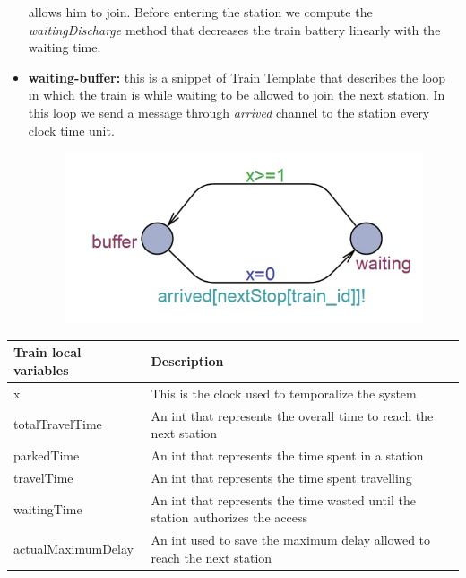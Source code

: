 \begin{itemize}
            allows him to join. Before entering the station we compute the \textit{waitingDischarge} method that decreases
            the train battery linearly with the waiting time.
    \item \textbf{waiting-buffer: }this is a snippet of Train Template that describes the loop in which the train is while
            waiting to be allowed to join the next station. In this loop we send a message through \emph{arrived} channel
            to the station every clock time unit.
            \begin{figure}[H]
                \centering
                \includegraphics[scale=0.56]{images/bufferSnippet.png}
            \end{figure}
\end{itemize}

\newpage

\begin{table} [H]
    \begin{tabu} to \textwidth {|X|X[3.5]|}
    \hline
    \textbf{Train local variables}              & \textbf{Description} \\  \hline
    x                       & This is the clock used to temporalize the system \\  \hline
    totalTravelTime         & An int that represents the overall time to reach the next station \\    \hline
    parkedTime              & An int that represents the time spent in a station \\    \hline
    travelTime              & An int that represents the time spent travelling \\  \hline
    waitingTime             & An int that represents the time wasted until the station authorizes the access \\  \hline
    actualMaximumDelay      & An int used to save the maximum delay allowed to reach the next station \\    \hline
    \end{tabu}
\end{table}

\newpage

